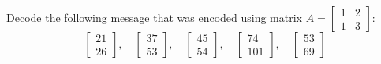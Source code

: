 \begin{example}
    Decode the following message that was encoded using matrix \( A = \begin{bmatrix} 1 & 2 \\ 1 & 3 \end{bmatrix} \):
    \[
        \begin{bmatrix} 21 \\ 26 \end{bmatrix}, \quad
        \begin{bmatrix} 37 \\ 53 \end{bmatrix}, \quad
        \begin{bmatrix} 45 \\ 54 \end{bmatrix}, \quad
        \begin{bmatrix} 74 \\ 101 \end{bmatrix}, \quad
        \begin{bmatrix} 53 \\ 69 \end{bmatrix}
    \]
\end{example}

